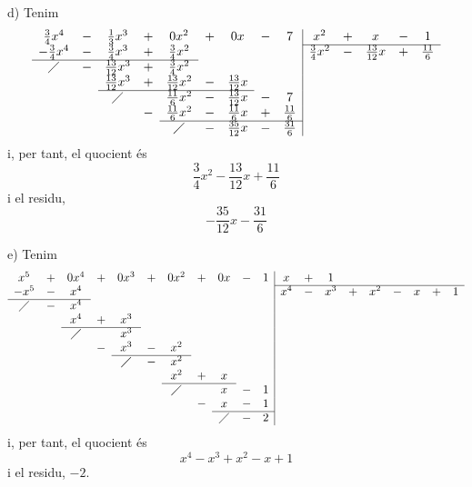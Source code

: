 \begin{solucio}
d) Tenim\[
\begin{array}{ccccccccc|ccccc}
\frac{3}{4}x^{4} & - & \frac{1}{3}x^{3} & + & 0x^{2} & + & 0x & - & 7 & x^{2}
& + & x & - & 1 \\ \cline{10-14}
-\frac{3}{4}x^{4} & - & \frac{3}{4}x^{3} & + & \frac{3}{4}x^{2} & & & &
& \frac{3}{4}x^{2} & - & \frac{13}{12}x & + & \frac{11}{6} \\ \cline{1-5}
\diagup & - & \frac{13}{12}x^{3} & + & \frac{3}{4}x^{2} & & & & & & &
& & \\
& & \frac{13}{12}x^{3} & + & \frac{13}{12}x^{2} & - & \frac{13}{12}x & &
& & & & & \\ \cline{3-7}
& & \diagup & & \frac{11}{6}x^{2} & - & \frac{13}{12}x & - & 7 & & & &
& \\
& & & - & \frac{11}{6}x^{2} & - & \frac{11}{6}x & + & \frac{11}{6} & & &
& & \\ \cline{5-9}
& & & & \diagup & - & \frac{35}{12}x & - & \frac{31}{6} & & & & &
\end{array}\]i, per tant, el quocient és\[
\frac{3}{4}x^{2}-\frac{13}{12}x+\frac{11}{6}
\]i el residu,\[
-\frac{35}{12}x-\frac{31}{6}
\]

e) Tenim\[
\begin{array}{ccccccccccc|ccccccccc}
x^{5} & + & 0x^{4} & + & 0x^{3} & + & 0x^{2} & + & 0x & - & 1 & x & + & 1 &
& & & & & \\ \cline{12-20}
-x^{5} & - & x^{4} & & & & & & & & & x^{4} & - & x^{3} & + & x^{2} &
- & x & + & 1 \\ \cline{1-3}
\diagup & - & x^{4} & & & & & & & & & & & & & & & & & \\
& & x^{4} & + & x^{3} & & & & & & & & & & & & & & & \\
\cline{3-5}
& & \diagup & & x^{3} & & & & & & & & & & & & & & & \\
& & & - & x^{3} & - & x^{2} & & & & & & & & & & & & & \\
\cline{5-7}
& & & & \diagup & - & x^{2} & & & & & & & & & & & & & \\
& & & & & & x^{2} & + & x & & & & & & & & & & & \\
\cline{7-9}
& & & & & & \diagup & & x & - & 1 & & & & & & & & & \\
& & & & & & & - & x & - & 1 & & & & & & & & & \\ \cline{9-11}
& & & & & & & & \diagup & - & 2 & & & & & & & & &
\end{array}\]i, per tant, el quocient és\[
x^{4}-x^{3}+x^{2}-x+1
\]i el residu, $-2$.
\end{solucio}

